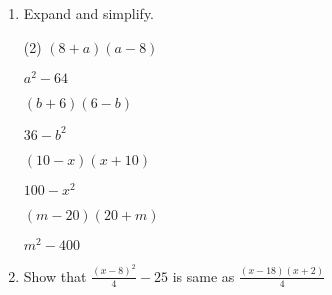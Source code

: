 \begin{enumerate} [leftmargin=0cm]
\item Expand and simplify.
\begin{tasks}[label=(\alph*), after-item-skip=2pt,after-skip=3pt, label-width=4ex](2)
    \task  $ ( 8+ a) (a-8)                 $    \\  \begin{envAnswer} $   a^2   -   64        $ \end{envAnswer}
    \task  $ ( b+ 6) (6-b)                 $    \\  \begin{envAnswer} $   36    -   b^2       $ \end{envAnswer}
    \task  $ (10-x ) (x+10)                $    \\  \begin{envAnswer} $   100   -   x^2       $ \end{envAnswer}
    \task  $ ( m-20) (20+m)                $    \\  \begin{envAnswer} $   m^2   -   400       $ \end{envAnswer}

\end{tasks}

\clearpage

\item Show that $\frac{(x-8)^2}{4}-25  $ is same as $\frac{(x-18)(x+2)}{4}$
    

\end{enumerate}
